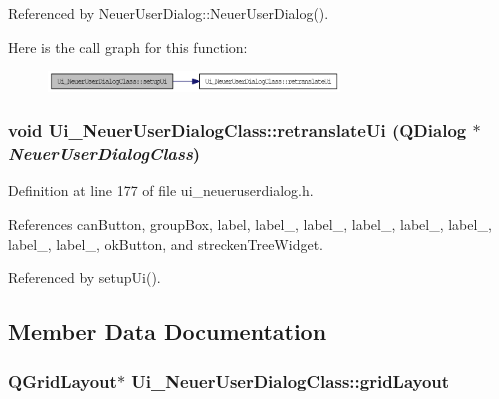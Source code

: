 Referenced by NeuerUserDialog::NeuerUserDialog().

Here is the call graph for this function:\nopagebreak
\begin{figure}[H]
\begin{center}
\leavevmode
\includegraphics[width=219pt]{class_ui___neuer_user_dialog_class_a5315d1a0ab462b8545f222ea764c6d6_cgraph}
\end{center}
\end{figure}
\hypertarget{class_ui___neuer_user_dialog_class_c41dc31482b964ce5ba62c50495081e8}{
\subsubsection[retranslateUi]{\setlength{\rightskip}{0pt plus 5cm}void Ui\_\-NeuerUserDialogClass::retranslateUi (QDialog $\ast$ {\em NeuerUserDialogClass})}}
\label{class_ui___neuer_user_dialog_class_c41dc31482b964ce5ba62c50495081e8}




Definition at line 177 of file ui\_\-neueruserdialog.h.

References canButton, groupBox, label, label\_, label\_, label\_, label\_, label\_, label\_, label\_, okButton, and streckenTreeWidget.

Referenced by setupUi().

\subsection{Member Data Documentation}
\hypertarget{class_ui___neuer_user_dialog_class_e427bb1509f6655a70388e6b4c5fdef1}{
\subsubsection[gridLayout]{\setlength{\rightskip}{0pt plus 5cm}QGridLayout$\ast$ {\bf Ui\_\-NeuerUserDialogClass::gridLayout}}}
\label{class_ui___neuer_user_dialog_class_e427bb1509f6655a70388e6b4c5fdef1}




